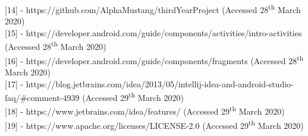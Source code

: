 \documentclass{article}
\begin{document}
[14] - https://github.com/AlphaMustang/thirdYearProject (Accessed 28\textsuperscript{th} March 2020) \\

[15] - https://developer.android.com/guide/components/activities/intro-activities (Accessed 28\textsuperscript{th} March 2020) \\

[16] - https://developer.android.com/guide/components/fragments (Accessed 28\textsuperscript{th} March 2020) \\

[17] - https://blog.jetbrains.com/idea/2013/05/intellij-idea-and-android-studio-faq/\#comment-4939 (Accessed 29\textsuperscript{th} March 2020) \\

[18] - https://www.jetbrains.com/idea/features/ (Accessed 29\textsuperscript{th} March 2020) \\ 

[19] - https://www.apache.org/licenses/LICENSE-2.0 (Accessed 29\textsuperscript{th} March 2020)
\end{document}
